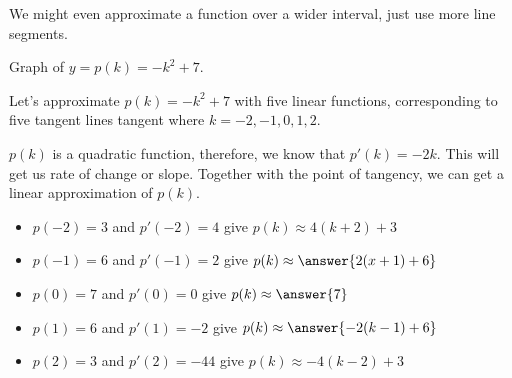 \documentclass{ximera}
\begin{document}
We might even approximate a function over a wider interval, just use more line segments.





Graph of $y = p(k) = -k^2 + 7$.




\begin{image}
\end{image}




Let's approximate $p(k) = -k^2+7$ with five linear functions, corresponding to five tangent lines tangent where $k=-2, -1, 0, 1, 2$.

$p(k)$ is a quadratic function, therefore, we know that $p'(k) = -2k$.  This will get us rate of change or slope.  Together with the point of tangency, we can get a linear approximation of $p(k)$.


\begin{itemize}
\item $p(-2) = 3$ and $p'(-2) = 4$ give $p(k) \approx 4(k+2)+3$
\item $p(-1) = 6$ and $p'(-1) = 2$ give $p(k) \approx \answer{2(x+1)+6}$
\item $p(0) = 7$ and $p'(0) = 0$   give $p(k) \approx \answer{7}$
\item $p(1) = 6$ and $p'(1) = -2$   give  $ p(k) \approx \answer{-2(k-1)+6}$
\item $p(2) = 3$ and $p'(2) = -44$   give $p(k) \approx -4(k-2)+3$
\end{itemize}
\end{document}

